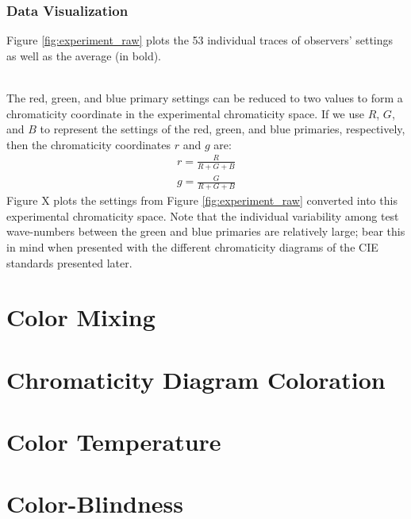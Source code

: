 \documentclass[twocolumn]{article}
\newif\ifinvert
\begin{document}
\subsubsection{Data Visualization}
Figure \ref{fig:experiment_raw} plots the 53 individual traces of observers' settings as well as the average (in bold).\\ \\
\begin{figure*}
\ifinvert

\else

\fi
\caption{Individual (faded) and average (bold) settings of the red, green, and blue primary lights relative to the test light intensity plotted across all test light wave-numbers.  Positive settings indicate primary lights added together on the "match" side of the stimulus.  Negative settings indicate primary lights instead added to the "test" side of the stimulus along with the test light.  Where horizontal and vertical dotted lines cross, no settings were recorded (note there is zero individual variability at these points); instead it was presumed that each primary would exactly match itself in isolation.  Note that the step size between test lights is larger below 16,000 $cm^{-1}$ and above 21,500 $cm^{-1}$.}\label{fig:experiment_raw}
\end{figure*}
The red, green, and blue primary settings can be reduced to two values to form a chromaticity coordinate in the experimental chromaticity space.  If we use $R$, $G$, and $B$ to represent the settings of the red, green, and blue primaries, respectively, then the chromaticity coordinates $r$ and $g$ are:
\begin{equation}\label{eq:experimental_chromaticity}
\begin{aligned}
r=\frac{R}{R+G+B}\\
g=\frac{G}{R+G+B}
\end{aligned}
\end{equation}
Figure X plots the settings from Figure \ref{fig:experiment_raw} converted into this experimental chromaticity space.  Note that the individual variability among test wave-numbers between the green and blue primaries are relatively large; bear this in mind when presented with the different chromaticity diagrams of the CIE standards presented later.
\section{Color Mixing} \label{sec:color_mixing}

\section{Chromaticity Diagram Coloration} \label{sec:chromaticity_coloration}

\section{Color Temperature} \label{sec:color_temperature}

\section{Color-Blindness} \label{sec:color_blindndess}
\twocolumn[
\printbibliography
]
\end{document}
